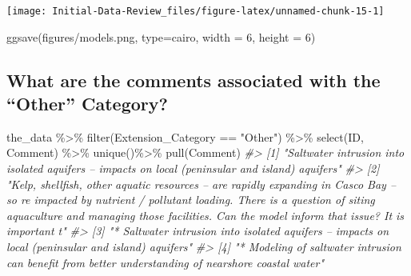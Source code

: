 \documentclass[
]{article}
\newenvironment{Shaded}{\begin{snugshade}}{\end{snugshade}}
\newcommand{\AttributeTok}[1]{\textcolor[rgb]{0.77,0.63,0.00}{#1}}
\newcommand{\CommentTok}[1]{\textcolor[rgb]{0.56,0.35,0.01}{\textit{#1}}}
\newcommand{\DecValTok}[1]{\textcolor[rgb]{0.00,0.00,0.81}{#1}}
\newcommand{\FunctionTok}[1]{\textcolor[rgb]{0.00,0.00,0.00}{#1}}
\newcommand{\NormalTok}[1]{#1}
\newcommand{\SpecialCharTok}[1]{\textcolor[rgb]{0.00,0.00,0.00}{#1}}
\newcommand{\StringTok}[1]{\textcolor[rgb]{0.31,0.60,0.02}{#1}}
\begin{document}
\begin{center}\texttt{[image: Initial-Data-Review\_files/figure-latex/unnamed-chunk-15-1]} \end{center}

\begin{Shaded}
\begin{Highlighting}[]
\FunctionTok{ggsave}\NormalTok{(}\StringTok{\textquotesingle{}figures/models.png\textquotesingle{}}\NormalTok{, }\AttributeTok{type=}\StringTok{\textquotesingle{}cairo\textquotesingle{}}\NormalTok{,}
         \AttributeTok{width =} \DecValTok{6}\NormalTok{, }\AttributeTok{height =} \DecValTok{6}\NormalTok{)}
\end{Highlighting}
\end{Shaded}

\hypertarget{what-are-the-comments-associated-with-the-other-category}{%
\subsection{What are the comments associated with the ``Other''
Category?}\label{what-are-the-comments-associated-with-the-other-category}}

\begin{Shaded}
\begin{Highlighting}[]
\NormalTok{the\_data }\SpecialCharTok{\%\textgreater{}\%}
  \FunctionTok{filter}\NormalTok{(Extension\_Category }\SpecialCharTok{==} \StringTok{"Other"}\NormalTok{) }\SpecialCharTok{\%\textgreater{}\%}
  \FunctionTok{select}\NormalTok{(ID, Comment) }\SpecialCharTok{\%\textgreater{}\%}
  \FunctionTok{unique}\NormalTok{()}\SpecialCharTok{\%\textgreater{}\%}
  \FunctionTok{pull}\NormalTok{(Comment)}
\CommentTok{\#\textgreater{} [1] "Saltwater intrusion into isolated aquifers – impacts on local (peninsular and island) aquifers"                                                                                                                                                                 }
\CommentTok{\#\textgreater{} [2] "Kelp, shellfish, other aquatic resources – are rapidly expanding in Casco Bay – so re impacted by nutrient / pollutant loading.  There is a  question of siting aquaculture and managing those facilities.  Can the model inform that issue?  It is important t"}
\CommentTok{\#\textgreater{} [3] "* Saltwater intrusion into isolated aquifers – impacts on local (peninsular and island) aquifers"                                                                                                                                                               }
\CommentTok{\#\textgreater{} [4] "* Modeling of saltwater intrusion can benefit from better understanding of nearshore coastal water"}
\end{Highlighting}
\end{Shaded}
\end{document}
